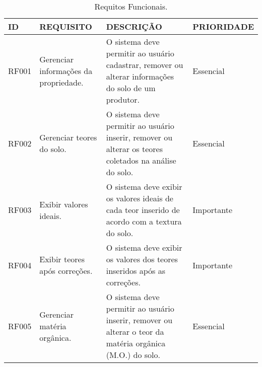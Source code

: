 \begin{table}[!htb]
    \caption[Requitos Funcionais]{Requitos Funcionais.
        \label{tab:tabela-requisitos}}
    \begin{tabular}{|m{1cm}|m{4cm}|m{6cm}|m{3cm}|}
        \toprule
        ID    & REQUISITO                                                                        & DESCRIÇÃO                                                                                                                                                                                                                                                                                      & PRIORIDADE  \\\hline
        \midrule
        RF001 & Gerenciar informações da propriedade.                                            & O sistema deve permitir ao usuário cadastrar, remover ou alterar informações do solo de um produtor.                                                                                                                                                                                           & Essencial  \\\hline
        RF002 & Gerenciar teores do solo.                                                        & O sistema deve permitir ao usuário inserir, remover ou alterar os teores coletados na análise do solo.                                                                                                                                                                                         & Essencial  \\\hline
        RF003 & Exibir valores ideais.                                                           & O sistema deve exibir os valores ideais de cada teor inserido de acordo com a textura do solo.                                                                                                                                                                                                 & Importante \\\hline
        RF004 & Exibir teores após correções.                                                    & O sistema deve exibir os valores dos teores inseridos após as correções.                                                                                                                                                                                                                       & Importante \\\hline
        RF005 & Gerenciar matéria orgânica.                                                      & O sistema deve permitir ao usuário inserir, remover ou alterar o teor da matéria orgânica (M.O.) do solo.                                                                                                                                                                                      & Essencial  \\\hline

\end{tabular}
\end{table}

